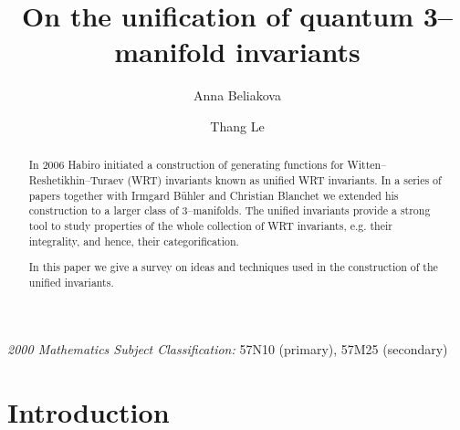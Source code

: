 \documentclass[12pt]{amsart}
\theoremstyle{plain}
\theoremstyle{definition}
\begin{document}
\title[Unified  3--manifold  invariants]{On the
unification of
quantum 3--manifold  invariants}

\author{Anna Beliakova}
\address{Institut f\"ur Mathematik, Universit\"at Zurich,
Winterthurerstrasse 190, 8057 Z\"urich, Switzerland}

\author{Thang Le}
\address{Department of Mathematics, Georgia Institute of Technology,
Atlanta, GA 30332--0160, USA }



\begin{abstract}
In 2006 Habiro initiated a construction of generating functions for
Witten--Reshetikhin--Turaev (WRT) invariants
known as unified WRT invariants. In a series of papers
together with Irmgard B\"uhler
and Christian Blanchet
we extended his construction to a larger class of 3--manifolds.
The unified invariants provide a strong tool to study  properties
of the whole collection of WRT invariants, e.g.  their integrality,
and hence, their categorification.


In this paper we give   a survey
on ideas and techniques used in the construction of the unified
invariants.










\end{abstract}

\maketitle



\vskip1mm

\noindent
{\it 2000 Mathematics Subject Classification:}
57N10 (primary), 57M25 (secondary)


\section*{Introduction}
\end{document}
